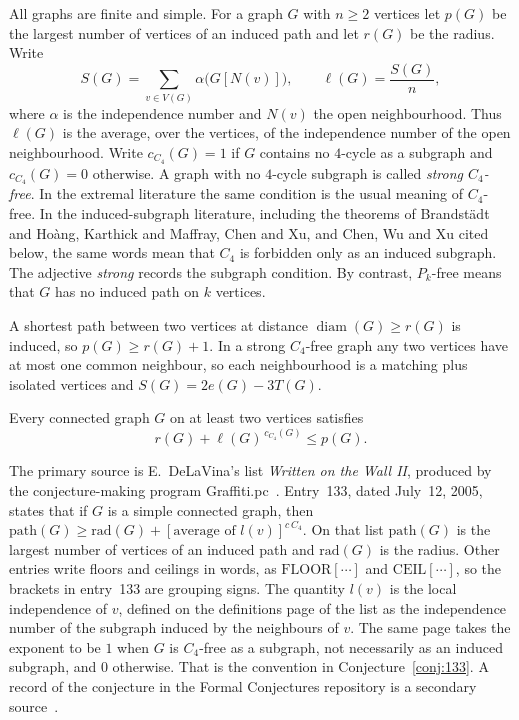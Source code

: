\documentclass[ASNA]{USG}
\theoremstyle{WBstyletwo}
\numberwithin{equation}{section}
\newcommand{\lr}{\ell}
\newcommand{\pp}{p}
\begin{document}
All graphs are finite and simple. For a graph $G$ with $n\ge 2$ vertices let $\pp(G)$ be the largest number of vertices of an induced path and let $r(G)$ be the radius. Write
\[
S(G)=\sum_{v\in V(G)}\alpha\bigl(G[N(v)]\bigr),\qquad \lr(G)=\frac{S(G)}{n},
\]
where $\alpha$ is the independence number and $N(v)$ the open neighbourhood. Thus $\lr(G)$ is the average, over the vertices, of the independence number of the open neighbourhood. Write $c_{C_4}(G)=1$ if $G$ contains no $4$-cycle as a subgraph and $c_{C_4}(G)=0$ otherwise. A graph with no $4$-cycle subgraph is called \emph{strong $C_4$-free}. In the extremal literature the same condition is the usual meaning of $C_4$-free. In the induced-subgraph literature, including the theorems of Brandst\"adt and Ho\`ang, Karthick and Maffray, Chen and Xu, and Chen, Wu and Xu cited below, the same words mean that $C_4$ is forbidden only as an induced subgraph. The adjective \emph{strong} records the subgraph condition. By contrast, $P_k$-free means that $G$ has no induced path on $k$ vertices.

A shortest path between two vertices at distance $\operatorname{diam}(G)\ge r(G)$ is induced, so $\pp(G)\ge r(G)+1$. In a strong $C_4$-free graph any two vertices have at most one common neighbour, so each neighbourhood is a matching plus isolated vertices and $S(G)=2e(G)-3T(G)$.

\begin{conjecture}\label{conj:133}
Every connected graph $G$ on at least two vertices satisfies
\[
r(G)+\lr(G)^{\,c_{C_4}(G)}\le \pp(G).
\]
\end{conjecture}

The primary source is E.~DeLaVina's list \emph{Written on the Wall II}, produced by the conjecture-making program Graffiti.pc~\cite{wowii}. Entry~133, dated July~12, 2005, states that if $G$ is a simple connected graph, then $\mathrm{path}(G)\ge\mathrm{rad}(G)+[\text{average of }l(v)]^{c\,C_4}$. On that list $\mathrm{path}(G)$ is the largest number of vertices of an induced path and $\mathrm{rad}(G)$ is the radius. Other entries write floors and ceilings in words, as $\mathrm{FLOOR}[\cdots]$ and $\mathrm{CEIL}[\cdots]$, so the brackets in entry~133 are grouping signs. The quantity $l(v)$ is the local independence of $v$, defined on the definitions page of the list as the independence number of the subgraph induced by the neighbours of $v$. The same page takes the exponent to be $1$ when $G$ is $C_4$-free as a subgraph, not necessarily as an induced subgraph, and $0$ otherwise. That is the convention in Conjecture~\ref{conj:133}. A record of the conjecture in the Formal Conjectures repository is a secondary source~\cite{fc133}.
\end{document}
